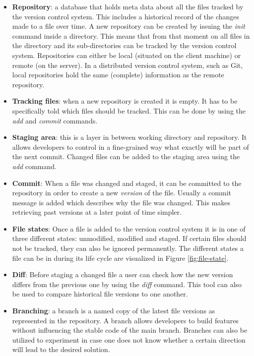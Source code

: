 \begin{itemize}
  \item \textbf{Repository}: a database that holds meta data about all the files tracked by the version control system. This includes a historical record of the changes made to a file over time. A new repository can be created by issuing the \textit{init} command inside a directory. This means that from that moment on all files in the directory and its sub-directories can be tracked by the version control system. Repositories can either be local (situated on the client machine) or remote (on the server). In a distributed version control system, such as Git, local repositories hold the same (complete) information as the remote repository.
  \item \textbf{Tracking files}: when a new repository is created it is empty. It has to be specifically told which files should be tracked. This can be done by using the \textit{add} and \textit{commit} commands.
  \item \textbf{Staging area}: this is a layer in between working directory and repository. It allows developers to control in a fine-grained way what exactly will be part of the next commit. Changed files can be added to the staging area using the \textit{add} command.
  \item \textbf{Commit}: When a file was changed and staged, it can be committed to the repository in order to create a new \textit{version} of the file. Usually a commit message is added which describes why the file was changed. This makes retrieving past versions at a later point of time simpler.
  \item \textbf{File states}: Once a file is added to the version control system it is in one of three different states: unmodified, modified and staged. If certain files should not be tracked, they can also be ignored permanently. The different states a file can be in during its life cycle are visualized in Figure \ref{fig:file-state}.
  \item \textbf{Diff}: Before staging a changed file a user can check how the new version differs from the previous one by using the \textit{diff} command. This tool can also be used to compare historical file versions to one another.
  \item \textbf{Branching}: a branch is a named copy of the latest file versions as represented in the repository. A branch allows developers to build features without influencing the stable code of the main branch. Branches can also be utilized to experiment in case one does not know whether a certain direction will lead to the desired solution.

\end{itemize}
